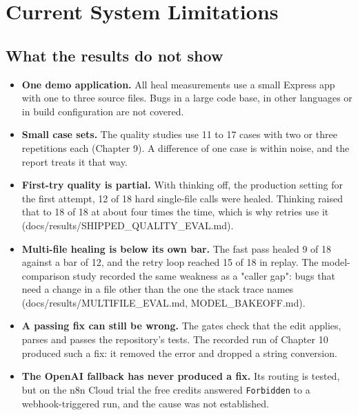 
\section{Current System Limitations}

\subsection{What the results do not show}

\begin{itemize}[leftmargin=*, itemsep=2pt]
\item \textbf{One demo application.} All heal measurements use a small Express app with one to three source files. Bugs in a large code base, in other languages or in build configuration are not covered.
\item \textbf{Small case sets.} The quality studies use 11 to 17 cases with two or three repetitions each (Chapter 9). A difference of one case is within noise, and the report treats it that way.
\item \textbf{First-try quality is partial.} With thinking off, the production setting for the first attempt, 12 of 18 hard single-file calls were healed. Thinking raised that to 18 of 18 at about four times the time, which is why retries use it (docs/\allowbreak{}results/\allowbreak{}SHIPPED\_\allowbreak{}QUALITY\_\allowbreak{}EVAL.md).
\item \textbf{Multi-file healing is below its own bar.} The fast pass healed 9 of 18 against a bar of 12, and the retry loop reached 15 of 18 in replay. The model-comparison study recorded the same weakness as a "caller gap": bugs that need a change in a file other than the one the stack trace names (docs/\allowbreak{}results/\allowbreak{}MULTIFILE\_\allowbreak{}EVAL.md, MODEL\_\allowbreak{}BAKEOFF.md).
\item \textbf{A passing fix can still be wrong.} The gates check that the edit applies, parses and passes the repository's tests. The recorded run of Chapter 10 produced such a fix: it removed the error and dropped a string conversion.
\item \textbf{The OpenAI fallback has never produced a fix.} Its routing is tested, but on the n8n Cloud trial the free credits answered \texttt{Forbidden} to a webhook-triggered run, and the cause was not established.
\end{itemize}


